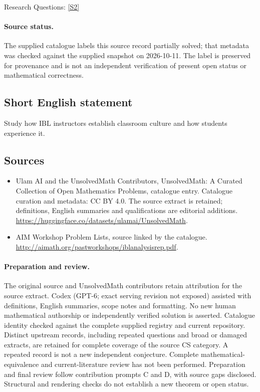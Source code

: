 \documentclass[11pt]{article}
\begin{document}
Research Questions: \href{http://aimath.org/pastworkshops/iblanalysisrep.pdf}{[S2]}
\paragraph{Source status.}
The supplied catalogue labels this source record partially solved; that metadata was checked against the supplied snapshot on 2026-10-11. The label is preserved for provenance and is not an independent verification of present open status or mathematical correctness.
\subsection{Short English statement}
Study how IBL instructors establish classroom culture and how students experience it.
\subsection{Sources}
\begin{itemize}
\item[S1] Ulam AI and the UnsolvedMath Contributors, UnsolvedMath: A Curated Collection of Open Mathematics Problems, catalogue entry. Catalogue curation and metadata: CC BY 4.0. The source extract is retained; definitions, English summaries and qualifications are editorial additions.
\url{https://huggingface.co/datasets/ulamai/UnsolvedMath}.
\item[S2] AIM Workshop Problem Lists, source linked by the catalogue.
\url{http://aimath.org/pastworkshops/iblanalysisrep.pdf}.
\end{itemize}
\paragraph{Preparation and review.}
The original source and UnsolvedMath contributors retain attribution for the source extract. Codex (GPT-6; exact serving revision not exposed) assisted with definitions, English summaries, scope notes and formatting. No new human mathematical authorship or independently verified solution is asserted. Catalogue identity checked against the complete supplied registry and current repository. Distinct upstream records, including repeated questions and broad or damaged extracts, are retained for complete coverage of the source CS category. A repeated record is not a new independent conjecture. Complete mathematical-equivalence and current-literature review has not been performed. Preparation and final review follow contribution prompts C and D, with source gaps disclosed. Structural and rendering checks do not establish a new theorem or open status.
\label{end:statement}
\end{document}

